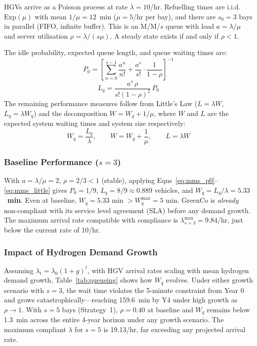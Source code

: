 \documentclass[10pt,a4paper]{article}
\begin{document}
HGVs arrive as a Poisson process at rate $\lambda = 10$/hr. Refuelling times are i.i.d.\ $\mathrm{Exp}(\mu)$ with mean $1/\mu = 12$~min ($\mu = 5$/hr per bay), and there are $s_0 = 3$ bays in parallel (FIFO, infinite buffer). This is an M/M/$s$ queue with load $a = \lambda/\mu$ and server utilisation $\rho = \lambda/(s\mu)$. A steady state exists if and only if $\rho < 1$.

The idle probability, expected queue length, and queue waiting times are:
\begin{equation}
    P_0 = \left[\sum_{n=0}^{s-1}\frac{a^n}{n!} + \frac{a^s}{s!}\cdot\frac{1}{1-\rho}\right]^{-1}
    \label{eq:mms_p0}
\end{equation}
\begin{equation}
    L_q = \frac{a^s\,\rho}{s!(1-\rho)^2}\,P_0
    \label{eq:mms_lq}
\end{equation}
The remaining performance measures follow from Little's Law ($L = \lambda W$, $L_q = \lambda W_q$) and the decomposition $W = W_q + 1/\mu$, where $W$ and $L$ are the expected system waiting times and system size respectively:
\begin{equation}
    W_q = \frac{L_q}{\lambda}, \qquad W = W_q + \frac{1}{\mu}, \qquad L = \lambda W
    \label{eq:mms_little}
\end{equation}

\subsubsection{Baseline Performance ($s = 3$)}

With $a = \lambda/\mu = 2$, $\rho = 2/3 < 1$ (stable), applying Eqns~\eqref{eq:mms_p0}--\eqref{eq:mms_little} gives $P_0 = 1/9$, $L_q = 8/9 \approx 0.889$ vehicles, and $W_q = L_q/\lambda = \mathbf{5.33}$~\textbf{min}. Even at baseline, $W_q = 5.33$ min $> W_q^{\max} = 5$ min. GreenCo is \textit{already} non-compliant with its service level agreement (SLA) before any demand growth. The maximum arrival rate compatible with compliance is $\lambda^{\max}_{s=3} = 9.84$/hr, just below the current rate of 10/hr.

\subsubsection{Impact of Hydrogen Demand Growth}

Assuming $\lambda_t = \lambda_0(1+g)^t$, with HGV arrival rates scaling with mean hydrogen demand growth, Table~\ref{tab:queueing} shows how $W_q$ evolves. Under either growth scenario with $s=3$, the wait time violates the 5-minute constraint from Year 0 and grows catastrophically---reaching 159.6~min by Y4 under high growth as $\rho \to 1$. With $s = 5$ bays (Strategy~1), $\rho = 0.40$ at baseline and $W_q$ remains below 1.3~min across the entire 4-year horizon under any growth scenario. The maximum compliant $\lambda$ for $s = 5$ is 19.13/hr, far exceeding any projected arrival rate.
\end{document}
